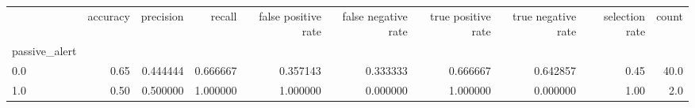 \begin{tabular}{lrrrrrrrrr}
\toprule
{} &  accuracy &  precision &    recall &  false positive rate &  false negative rate &  true positive rate &  true negative rate &  selection rate &  count \\
passive\_alert &           &            &           &                      &                      &                     &                     &                 &        \\
\midrule
0.0           &      0.65 &   0.444444 &  0.666667 &             0.357143 &             0.333333 &            0.666667 &            0.642857 &            0.45 &   40.0 \\
1.0           &      0.50 &   0.500000 &  1.000000 &             1.000000 &             0.000000 &            1.000000 &            0.000000 &            1.00 &    2.0 \\
\bottomrule
\end{tabular}
